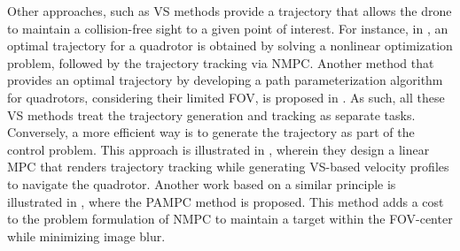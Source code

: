 \documentclass[letterpaper, 10 pt, conference]{ieeeconf}  %
\begin{document}
Other approaches, such as  \Ac{VS} methods provide a trajectory that allows the drone to maintain a collision-free sight to a given point of interest. For instance, in \cite{target_aware}, an optimal trajectory for a quadrotor is obtained by solving a nonlinear optimization problem, followed by the trajectory tracking via \ac{NMPC}. Another method that provides an optimal trajectory by developing a path parameterization algorithm for quadrotors, considering their limited \ac{FOV}, is proposed in \cite{mit}. %
As such, all these \ac{VS} methods treat the trajectory generation and tracking as separate tasks. Conversely, a more efficient way is to generate the trajectory as part of the control problem. This approach is illustrated in \cite{VS_MPC}, %
wherein they design a linear MPC that renders trajectory tracking while generating {\ac{VS}}-based velocity profiles to navigate the quadrotor.
Another work based on a similar principle is illustrated in \cite{falanga2018pampc}, where the \ac{PAMPC} method is proposed. This method adds a cost to the problem formulation of \ac{NMPC} to maintain a target within the \ac{FOV}-center while minimizing image blur. %
\end{document}
